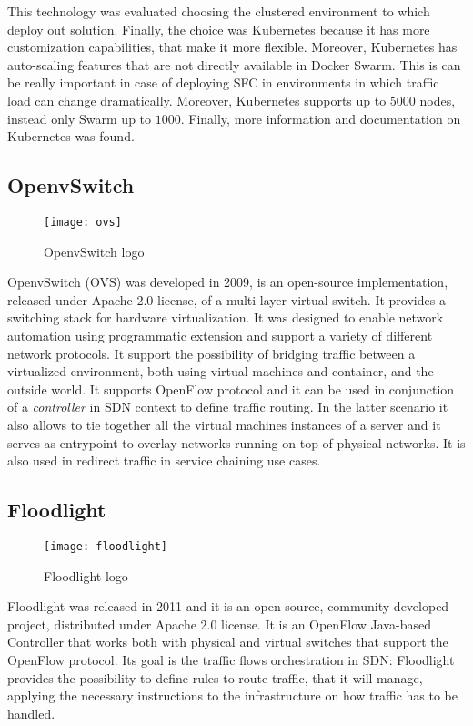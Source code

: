 This technology was evaluated choosing the clustered environment to which deploy
out solution. Finally, the choice was Kubernetes because it has more
customization capabilities, that make it more flexible. Moreover, Kubernetes has
auto-scaling features that are not directly available in Docker Swarm. This is
can be really important in case of deploying SFC in environments in which
traffic load can change dramatically. Moreover, Kubernetes supports up to $5000$
nodes, instead only Swarm up to $1000$. Finally, more information and
documentation on Kubernetes was found.

\subsection{OpenvSwitch}
\begin{figure}[h]
 \centering \texttt{[image: ovs]}
 \caption{OpenvSwitch logo}
 \label{chap:prjan:img:ovs_logo}
\end{figure}
OpenvSwitch (OVS) was developed in 2009, is an open-source implementation,
released under Apache 2.0 license, of a multi-layer virtual switch. It provides
a switching stack for hardware virtualization. It was designed to enable network
automation using programmatic extension and support a variety of different
network protocols. It support the possibility of bridging traffic between a
virtualized environment, both using virtual machines and container, and the
outside world. It supports OpenFlow protocol and it can be used in conjunction
of a \emph{controller} in SDN context to define traffic routing. In the latter
scenario it also allows to tie together all the virtual machines instances
of a server and it serves as entrypoint to overlay networks running on top of
physical networks. It is also used in redirect traffic in service chaining use
cases.

\subsection{Floodlight}
\begin{figure}[h]
 \centering \texttt{[image: floodlight]}
 \caption{Floodlight logo}
 \label{chap:prjan:img:floodlight_logo}
\end{figure}
Floodlight was released in 2011 and it is an open-source, community-developed
project, distributed under Apache 2.0 license. It is an OpenFlow Java-based
Controller that works both with physical and virtual switches that support the
OpenFlow protocol. Its goal is the traffic flows orchestration in
SDN: Floodlight provides the possibility to define rules to route traffic, that
it will manage, applying the necessary instructions to the infrastructure on how
traffic has to be handled.

